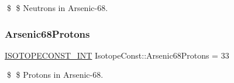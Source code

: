 \$ \$ Neutrons in Arsenic-\/68. \mbox{\label{group___isotope_const-_arsenic-_as68_ga7bf1050cad4fa49a2742c7ff7c941e6e}} 
\subsubsection{\texorpdfstring{Arsenic68\+Protons}{Arsenic68Protons}}
{\footnotesize\ttfamily \mbox{\hyperlink{group___isotope_const-_macros_ga5f18360b3e99483a35c32d789e62621c}{I\+S\+O\+T\+O\+P\+E\+C\+O\+N\+S\+T\+\_\+\+I\+NT}} Isotope\+Const\+::\+Arsenic68\+Protons = 33}

\$ \$ Protons in Arsenic-\/68. 